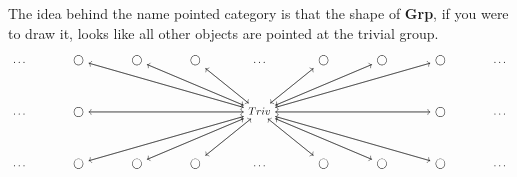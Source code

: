 The idea behind the name pointed category is that the shape of \textbf{Grp}, if you were to draw it,
looks like all other objects are pointed at the trivial group.
\[
  \begin{tikzcd}[column sep=large]
    \dots
    & \bigcirc \arrow [drrr, ""]
    & \bigcirc \arrow[drr, ""]
    & \bigcirc \arrow[dr, ""]
    & \dots
    & \bigcirc \arrow[dl, ""]
    & \bigcirc \arrow[dll,""]
    & \bigcirc \arrow[dlll,""]
    & \dots \\[5mm]
    \dots
    & \bigcirc \arrow[rrr, ""]
    & & &
    Triv
    \arrow[dlll, ""]
    \arrow[dll, ""]
    \arrow[dl, ""]
    \arrow[dr, ""]
    \arrow[drr, ""]
    \arrow[drrr, ""]
    \arrow[ulll, ""]
    \arrow[ull, ""]
    \arrow[ul, ""]
    \arrow[ur, ""]
    \arrow[urr, ""]
    \arrow[urrr, ""]
    \arrow[rrr, ""]
    \arrow[lll, ""]
    & &
    &  \bigcirc \arrow[lll, ""]
    & \dots   \\[5mm]
    \dots
    & \bigcirc \arrow [urrr, ""]
    & \bigcirc \arrow[urr, ""]
    & \bigcirc \arrow[ur, ""]
    & \dots
    & \bigcirc \arrow[ul, ""]
    & \bigcirc \arrow[ull,""]
    & \bigcirc \arrow[ulll,""]
    & \dots
  \end{tikzcd}
\]


